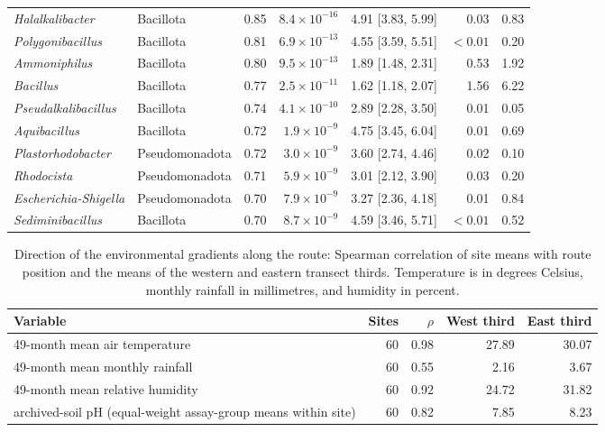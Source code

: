 \begin{table}[htbp]
\begin{tabular}{llrrrrr}
\textit{Halalkalibacter} & Bacillota & 0.85 & $8.4\times10^{-16}$ & 4.91 [3.83, 5.99] & 0.03 & 0.83 \\
\textit{Polygonibacillus} & Bacillota & 0.81 & $6.9\times10^{-13}$ & 4.55 [3.59, 5.51] & $<0.01$ & 0.20 \\
\textit{Ammoniphilus} & Bacillota & 0.80 & $9.5\times10^{-13}$ & 1.89 [1.48, 2.31] & 0.53 & 1.92 \\
\textit{Bacillus} & Bacillota & 0.77 & $2.5\times10^{-11}$ & 1.62 [1.18, 2.07] & 1.56 & 6.22 \\
\textit{Pseudalkalibacillus} & Bacillota & 0.74 & $4.1\times10^{-10}$ & 2.89 [2.28, 3.50] & 0.01 & 0.05 \\
\textit{Aquibacillus} & Bacillota & 0.72 & $1.9\times10^{-9}$ & 4.75 [3.45, 6.04] & 0.01 & 0.69 \\
\textit{Plastorhodobacter} & Pseudomonadota & 0.72 & $3.0\times10^{-9}$ & 3.60 [2.74, 4.46] & 0.02 & 0.10 \\
\textit{Rhodocista} & Pseudomonadota & 0.71 & $5.9\times10^{-9}$ & 3.01 [2.12, 3.90] & 0.03 & 0.20 \\
\textit{Escherichia-Shigella} & Pseudomonadota & 0.70 & $7.9\times10^{-9}$ & 3.27 [2.36, 4.18] & 0.01 & 0.84 \\
\textit{Sediminibacillus} & Bacillota & 0.70 & $8.7\times10^{-9}$ & 4.59 [3.46, 5.71] & $<0.01$ & 0.52 \\
\bottomrule
\end{tabular}
\end{table}

\begin{table}[htbp]
\centering\footnotesize
\caption{Direction of the environmental gradients along the route: Spearman correlation of site means with route position and the means of the western and eastern transect thirds. Temperature is in degrees Celsius, monthly rainfall in millimetres, and humidity in percent.}
\label{tab:route_gradients}
\begin{tabular}{lrrrr}
\toprule
Variable & Sites & $\rho$ & West third & East third \\
\midrule
49-month mean air temperature & 60 & 0.98 & 27.89 & 30.07 \\
49-month mean monthly rainfall & 60 & 0.55 & 2.16 & 3.67 \\
49-month mean relative humidity & 60 & 0.92 & 24.72 & 31.82 \\
archived-soil pH (equal-weight assay-group means within site) & 60 & 0.82 & 7.85 & 8.23 \\
\bottomrule
\end{tabular}
\end{table}
